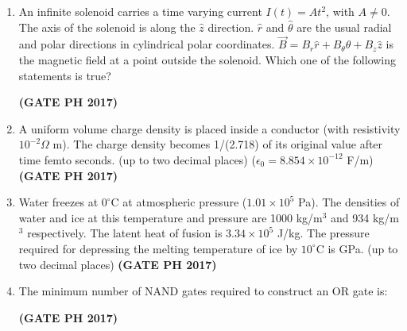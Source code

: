 \documentclass[14pt, a4paper]{extarticle}
\renewcommand{\vec}[1]{\overrightarrow{#1}}
\begin{document}
\begin{enumerate}[label=\textbf{Q.\arabic*}]
\item An infinite solenoid carries a time varying current $I(t) = A t^2$, with $A \neq 0$. The axis of the solenoid is along the $\hat{z}$ direction. $\hat{r}$ and $\hat{\theta}$ are the usual radial and polar directions in cylindrical polar coordinates. $\vec{B} = B_r \hat{r} + B_{\theta} \hat{\theta} + B_z \hat{z}$ is the magnetic field at a point outside the solenoid. Which one of the following statements is true?
\begin{enumerate}
\end{enumerate}
\hfill \textbf{(GATE PH 2017)}

\item A uniform volume charge density is placed inside a conductor (with resistivity $10^{-2} \Omega$ m). The charge density becomes 1/(2.718) of its original value after time \underline{\hspace{3cm}} femto seconds. (up to two decimal places) ($\epsilon_0 = 8.854 \times 10^{-12}$ F/m)
\hfill \textbf{(GATE PH 2017)}

\item Water freezes at $0^{\circ}$C at atmospheric pressure ($1.01 \times 10^5$ Pa). The densities of water and ice at this temperature and pressure are 1000 kg/m$^3$ and 934 kg/m$^3$ respectively. The latent heat of fusion is $3.34 \times 10^5$ J/kg. The pressure required for depressing the melting temperature of ice by $10^{\circ}$C is \underline{\hspace{3cm}} GPa. (up to two decimal places)
\hfill \textbf{(GATE PH 2017)}

\item The minimum number of NAND gates required to construct an OR gate is:
\begin{enumerate}
\end{enumerate}
\hfill \textbf{(GATE PH 2017)}


\end{enumerate}
\end{document}
